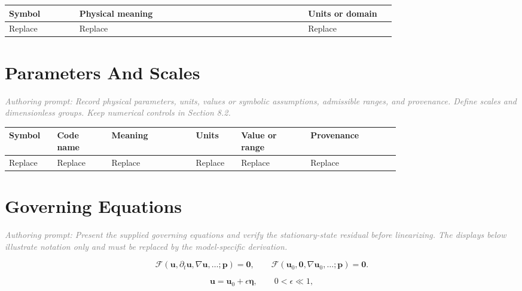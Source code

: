 \documentclass[11pt]{article}
\newcommand{\authorprompt}[1]{\textcolor{gray}{\emph{Authoring prompt: #1}}}
\newcommand{\vect}[1]{\bm{#1}}
\begin{document}
\begin{center}
\begin{tabular}{p{0.16\linewidth}p{0.52\linewidth}p{0.20\linewidth}}
\toprule
Symbol & Physical meaning & Units or domain \\
\midrule
Replace & Replace & Replace \\
\bottomrule
\end{tabular}
\end{center}

\section{Parameters And Scales}

\authorprompt{Record physical parameters, units, values or symbolic assumptions, admissible ranges, and provenance. Define scales and dimensionless groups. Keep numerical controls in Section 8.2.}

\begin{center}
\small
\begin{tabular}{p{0.08\linewidth}p{0.11\linewidth}p{0.17\linewidth}p{0.08\linewidth}p{0.14\linewidth}p{0.18\linewidth}}
\toprule
Symbol & Code name & Meaning & Units & Value or range & Provenance \\
\midrule
Replace & Replace & Replace & Replace & Replace & Replace \\
\bottomrule
\end{tabular}
\end{center}

\section{Governing Equations}

\authorprompt{Present the supplied governing equations and verify the stationary-state residual before linearizing. The displays below illustrate notation only and must be replaced by the model-specific derivation.}

\begin{equation}
  \mathcal{F}\!\left(\vect{u},\partial_t\vect{u},\nabla\vect{u},\ldots;\vect{p}\right)=\vect{0},
  \qquad
  \mathcal{F}\!\left(\vect{u}_0,\vect{0},\nabla\vect{u}_0,\ldots;\vect{p}\right)=\vect{0}.
  \label{eq:governing-pattern}
\end{equation}

\begin{equation}
  \vect{u}=\vect{u}_0+\epsilon\vect{\eta},
  \qquad 0<\epsilon\ll1,
  \label{eq:perturbation-pattern}
\end{equation}
\end{document}
